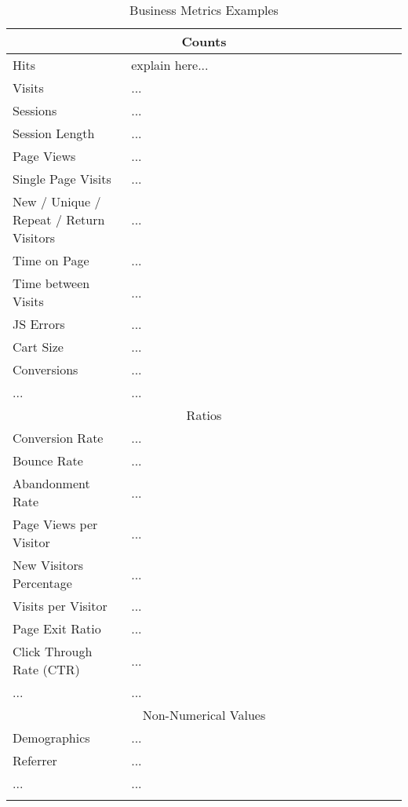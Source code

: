 \begin{center}
	\small
	\begin{longtable}{ | p{0.3\linewidth} | p{0.7\linewidth} | }
	
	\hline
	\multicolumn{2}{|c|}{ \cellcolor{lightgrey} Counts} \\
	\hline
	Hits & explain here... \\
	\hline
	Visits & ... \\
	\hline
	Sessions & ... \\
	\hline
	Session Length & ... \\
	\hline
	Page Views & ... \\
	\hline
	Single Page Visits & ... \\
	\hline
	New / Unique / Repeat / Return Visitors & ... \\
	\hline
	Time on Page & ... \\
	\hline
	Time between Visits & ... \\
	\hline
	JS Errors & ... \\
	\hline
	Cart Size & ... \\
	\hline
	Conversions & ... \\
	\hline
	... & ... \\

	\hline
	\multicolumn{2}{|c|}{ \cellcolor{lightgrey} Ratios} \\
	\hline
	Conversion Rate & ... \\
	\hline
	Bounce Rate & ... \\
	\hline
	Abandonment Rate & ... \\
	\hline
	Page Views per Visitor & ... \\
	\hline
	New Visitors Percentage & ... \\
	\hline
	Visits per Visitor & ... \\
	\hline
	Page Exit Ratio & ... \\
	\hline
	Click Through Rate (CTR) & ... \\
	\hline
	... & ... \\	
	
	\hline
	\multicolumn{2}{|c|}{ \cellcolor{lightgrey} Non-Numerical Values} \\
	\hline
	Demographics & ... \\	
	\hline
	Referrer & ... \\	
	\hline
	... & ... \\
	\hline
	
	\caption{Business Metrics Examples} %
	\label{tab:businessmetrics}
	\end{longtable}
\end{center}


